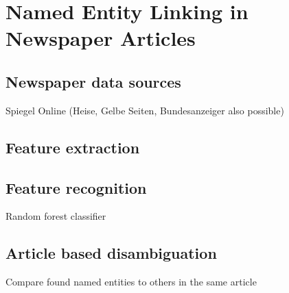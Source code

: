 \section{Named Entity Linking in Newspaper Articles}
\label{sec:nel}
\subsection{Newspaper data sources}
Spiegel Online (Heise, Gelbe Seiten, Bundesanzeiger also possible)\\

\subsection{Feature extraction}
\subsection{Feature recognition}
Random forest classifier\\

\subsection{Article based disambiguation}
Compare found named entities to others in the same article\\
